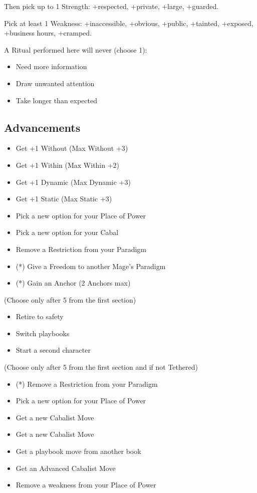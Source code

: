 \documentclass[
  oneside,
  statementpaper,
  9pt]{memoir}
\begin{document}
Then pick up to 1 Strength: +respected, +private, +large, +guarded.

Pick at least 1 Weakness: +inaccessible, +obvious, +public, +tainted,
+exposed, +business hours, +cramped.

A Ritual performed here will never (choose 1):

\begin{itemize}
\tightlist
\item
  Need more information
\item
  Draw unwanted attention
\item
  Take longer than expected
\end{itemize}

\hypertarget{advancements}{%
\subsection{Advancements}\label{advancements}}

\begin{itemize}
\tightlist
\item
  Get +1 Without (Max Without +3)
\item
  Get +1 Within (Max Within +2)
\item
  Get +1 Dynamic (Max Dynamic +3)
\item
  Get +1 Static (Max Static +3)
\item
  Pick a new option for your Place of Power
\item
  Pick a new option for your Cabal
\item
  Remove a Restriction from your Paradigm
\item
  (*) Give a Freedom to another Mage's Paradigm
\item
  (*) Gain an Anchor (2 Anchors max)
\end{itemize}

(Choose only after 5 from the first section)

\begin{itemize}
\tightlist
\item
  Retire to safety
\item
  Switch playbooks
\item
  Start a second character
\end{itemize}

(Choose only after 5 from the first section and if not Tethered)

\begin{itemize}
\tightlist
\item
  (*) Remove a Restriction from your Paradigm
\item
  Pick a new option for your Place of Power
\item
  Get a new Cabalist Move
\item
  Get a new Cabalist Move
\item
  Get a playbook move from another book
\item
  Get an Advanced Cabalist Move
\item
  Remove a weakness from your Place of Power
\end{itemize}
\end{document}
